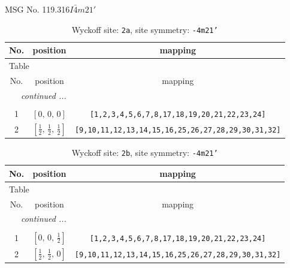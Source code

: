 \documentclass[fleqn,8pt]{jsarticle}
\begin{document}
\setcounter{MaxMatrixCols}{32}

\renewcommand{\tablename}{Table~}
\renewcommand{\figurename}{Figure~}
\begin{center}
\LARGE
MSG No. 119.316\quad$I\bar{4}m21'$
\end{center}
\renewcommand{\arraystretch}{1.2}
\begin{longtable}{ccc}
\caption{Wyckoff site: {\tt 2a}, site symmetry: {\tt -4m21'}}
 \\
 \hline \hline
No. & position & mapping \\ \hline \endfirsthead

\multicolumn{2}{l}{\tablename\ \thetable{}} \\
 \hline \hline
No. & position & mapping \\ \hline \endhead

 \hline \hline
\multicolumn{2}{r}{\footnotesize\it continued ...} \\ \endfoot

 \hline \hline
\multicolumn{2}{r}{} \\ \endlastfoot

1 & $\left[ 0,\, 0,\, 0 \right]$ & {\tt [1,2,3,4,5,6,7,8,17,18,19,20,21,22,23,24]} \\ \hline
2 & $\left[ \frac{1}{2},\, \frac{1}{2},\, \frac{1}{2} \right]$ & {\tt [9,10,11,12,13,14,15,16,25,26,27,28,29,30,31,32]} \\
\end{longtable}
\renewcommand{\arraystretch}{1.2}
\begin{longtable}{ccc}
\caption{Wyckoff site: {\tt 2b}, site symmetry: {\tt -4m21'}}
 \\
 \hline \hline
No. & position & mapping \\ \hline \endfirsthead

\multicolumn{2}{l}{\tablename\ \thetable{}} \\
 \hline \hline
No. & position & mapping \\ \hline \endhead

 \hline \hline
\multicolumn{2}{r}{\footnotesize\it continued ...} \\ \endfoot

 \hline \hline
\multicolumn{2}{r}{} \\ \endlastfoot

1 & $\left[ 0,\, 0,\, \frac{1}{2} \right]$ & {\tt [1,2,3,4,5,6,7,8,17,18,19,20,21,22,23,24]} \\ \hline
2 & $\left[ \frac{1}{2},\, \frac{1}{2},\, 0 \right]$ & {\tt [9,10,11,12,13,14,15,16,25,26,27,28,29,30,31,32]} \\
\end{longtable}
\end{document}
